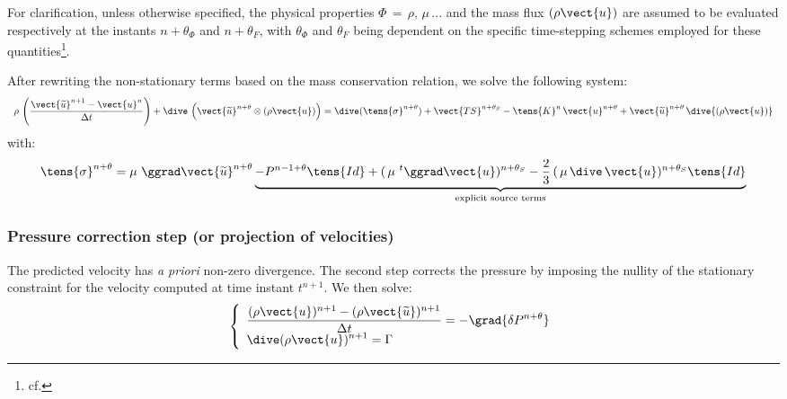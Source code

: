 For clarification, unless otherwise specified, the physical properties
$\Phi\,=\,\rho,\,\mu\,...$ and the mass flux $(\rho\vect{u})$ are assumed
to be evaluated respectively at the instants $n+\theta_\Phi$ and
$n+\theta_F$, with $\theta_\Phi$ and $\theta_F$ being dependent on the
specific time-stepping schemes employed for these
quantities\footnote{cf. }.

After rewriting the non-stationary terms based on the mass conservation relation,
we solve the following system:
\begin{equation}
\begin{array}{l}
\displaystyle
\rho\,\left(\displaystyle\frac{\vect{\widetilde{u}}^{n+1}-\vect {u}^{n}}{\Delta t}\right) +
\dive \,\left(\vect{\widetilde{u}}^{n+\theta} \otimes (\rho\vect{u})\right) =
\dive(\tens{\sigma}^{n+\theta})+\vect{TS}^{n+\theta_{S}}-\tens{K}^{n}\,\vect{u}^{n+\theta} +\vect{\widetilde{u}}^{n+\theta}\,\dive{(\rho\vect{u})}\\
\label{Base_Navstv_eq_prediction_continue}
\end{array}
\end{equation}
with:
\begin{equation}
\begin{array}{l}
\displaystyle
\tens{\sigma}^{n+\theta}=\mu\,\,\ggrad\vect{\widetilde{u}}^{n+\theta}\underbrace{-P^{n-1+\theta}\tens{Id}+(\,\mu\,\,^{t}\ggrad\vect{u})^{n+\theta_{S}}- \frac{2}{3}\,(\,\mu\, \dive\,\vect{u})^{n+\theta_{S}}\tens{Id}}_{\text{explicit source terms}}\\
\end{array}
\end{equation}

\subsubsection*{\bf Pressure correction step (or projection of velocities)}
The predicted velocity has {\it a priori} non-zero divergence. The second step
corrects the pressure by imposing the nullity of the stationary constraint for
the velocity computed at time instant ${t^{n+1}}$.
We then solve:
\begin{equation}\label{Base_Navstv_eq_correction_continue}
\left\{\begin{array}{l}
\displaystyle\frac{(\rho\vect{u})^{n+1}-(\rho\vect{\widetilde{u}})^{n+1}}{\Delta t} =
-\grad{\delta P^{n+\theta}} \\
\displaystyle
\dive(\rho\vect{u})^{n+1} = \Gamma\\
\end{array}\right.
\end{equation}

